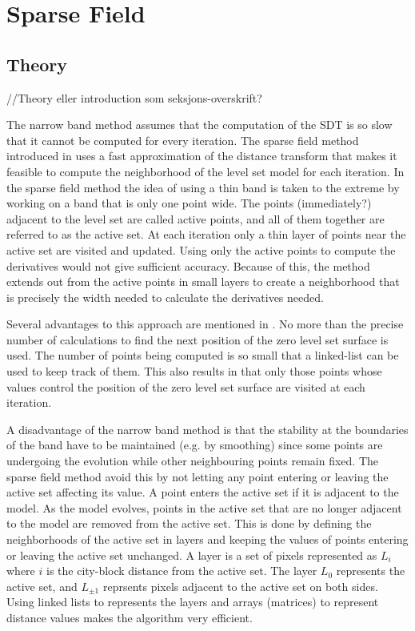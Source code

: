 \chapter{Sparse Field}

\section{Theory} //Theory eller introduction som seksjons-overskrift?

The narrow band  method assumes that the computation of the SDT is so slow that it cannot be computed for every iteration. The sparse field method introduced in \cite{whitaker89} uses a fast approximation of the distance transform that makes it feasible to compute the neighborhood of the level set model for each iteration. In the sparse field method the idea of using a thin band is taken to the extreme by working on a band that is only one point wide. The points (immediately?) adjacent to the level set are called active points, and all of them together are referred to as the active set. At each iteration only a thin layer of points near the active set are visited and updated. Using only the active points to compute the derivatives would not give sufficient accuracy. Because of this, the method extends out from the active points in small layers to create a neighborhood that is precisely the width needed to calculate the derivatives needed. 

Several advantages to this approach are mentioned in \cite{whitaker89}. No more than the precise number of calculations to find the next position of the zero level set surface is used. The number of points being computed is so small that a linked-list can be used to keep track of them. This also results in that only those points whose values control the position of the zero level set surface are visited at each iteration. 


A disadvantage of the narrow band method is that the stability at the boundaries of the band have to be maintained (e.g. by smoothing) since some points are undergoing the evolution while other neighbouring points remain fixed. The sparse field method avoid this by not letting any point entering or leaving the active set affecting its value. A point enters the active set if it is adjacent to the model. As the model evolves, points in the active set that are no longer adjacent to the model are removed from the active set. This is done by defining the neighborhoods of the active set in layers and keeping the values of points entering or leaving the active set unchanged. A layer is a set of pixels represented as \(L_{i}\) where \(i\) is the city-block distance from the active set. The layer \(L_{0}\) represents the active set, and \(L_{\pm 1}\) reprsents pixels adjacent to the active set on both sides. Using linked lists to represents the layers and arrays (matrices) to represent distance values makes the algorithm very efficient. 

